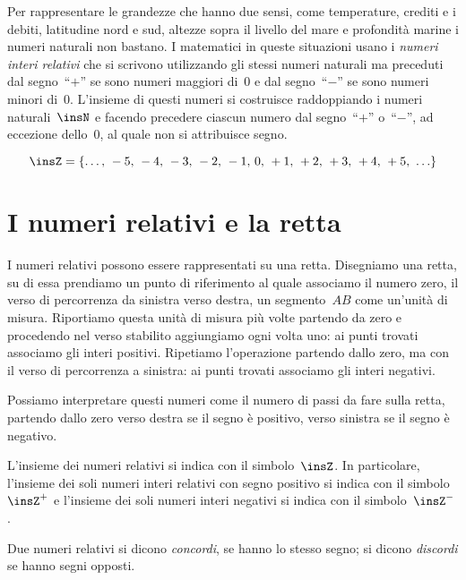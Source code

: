 Per rappresentare le grandezze che hanno due sensi, come temperature, crediti e i debiti, latitudine nord e sud,
altezze sopra il livello del mare e profondità marine i numeri naturali non bastano. I matematici in queste
situazioni usano i \emph{numeri interi relativi} che si scrivono utilizzando gli stessi numeri naturali ma preceduti
dal segno~``$+$'' se sono numeri maggiori di~0 e dal segno~``$-$'' se sono numeri minori di~0. L'insieme di questi numeri
si costruisce raddoppiando i numeri naturali~$\insN$ e facendo precedere ciascun numero dal segno~``$+$'' o~``$-$'',
ad eccezione dello~0, al quale non si attribuisce segno.

\[ \insZ=\lbrace\ldots\text{,~}-5\text{,~}-4\text{,~}-3\text{,~}-2\text{,~}-1\text{,~}0\text{,~}+1\text{,~}+2\text{,~}+3\text{,~}+4\text{,~}+5\text{,~}\ldots\rbrace \]
\pagebreak

\section{I numeri relativi e la retta}

I numeri relativi possono essere rappresentati su una retta. Disegniamo una retta, su di essa prendiamo
un punto di riferimento al quale associamo il numero zero, il verso di percorrenza da sinistra verso destra,
un segmento~$AB$ come un'unità di misura. Riportiamo questa unità di misura più volte partendo da zero e
procedendo nel verso stabilito aggiungiamo ogni volta uno: ai punti trovati associamo gli interi positivi.
Ripetiamo l'operazione partendo dallo zero, ma con il verso di percorrenza a sinistra: ai punti trovati associamo
gli interi negativi.

\begin{center}
 
\end{center}

Possiamo interpretare questi numeri come il numero di passi da fare sulla retta, partendo dallo zero verso
destra se il segno è positivo, verso sinistra se il segno è negativo.

L'insieme dei numeri relativi si indica con il simbolo~$\insZ$. In particolare, l'insieme dei soli numeri interi relativi
con segno positivo si indica con il simbolo~$\insZ^+$ e
l'insieme dei soli numeri interi negativi si indica con il simbolo~$\insZ^-$.

\begin{definizione}
 Due numeri relativi si dicono \emph{concordi}, se hanno lo stesso segno; si dicono \emph{discordi} se hanno
 segni opposti.
\end{definizione}

